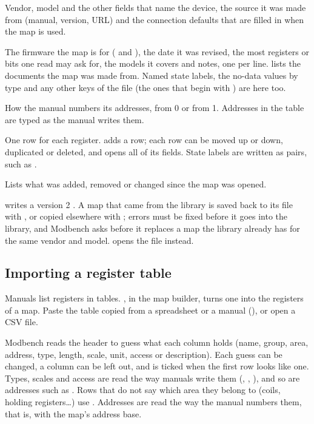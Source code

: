 \begin{description}[style=nextline, leftmargin=0pt, font=\intermedium]
  \item[Device] Vendor, model and the other fields that name the device, the
    source it was made from (manual, version, URL) and the connection defaults
    that are filled in when the map is used.
  \item[Optional parameters] The firmware the map is for ( and ), the date it was revised, the most
    registers or bits one read may ask for, the models it covers and notes,
    one per line.  lists the documents the map was made from.
    Named state labels, the no-data values by type and any other keys of the
    file (the ones that begin with ) are here too.
  \item[Address base] How the manual numbers its addresses, from 0 or from 1.
    Addresses in the table are typed as the manual writes them.
  \item[Registers] One row for each register.  adds a row;
    each row can be moved up or down, duplicated or deleted, and
     opens all of its fields. State labels are written as
    pairs, such as .
  \item[Changes from the original] Lists what was added, removed or changed
    since the map was opened.
\end{description}

 writes a version 2 . A map that came from the
library is saved back to its file with , or copied elsewhere with
; errors must be fixed before it goes into the library, and
Modbench asks before it replaces a map the library already has for the same
vendor and model.  opens the file instead.

\subsection{Importing a register table}

Manuals list registers in tables. , in the map builder,
turns one into the registers of a map. Paste the table copied from a
spreadsheet or a manual (), or open a CSV file.

Modbench reads the header to guess what each column holds (name, group, area,
address, type, length, scale, unit, access or description). Each guess can be
changed, a column can be left out, and  is
ticked when the first row looks like one. Types, scales and access are read the
way manuals write them (, , ), and so are
addresses such as . Rows that do not say
which area they belong to (coils, holding registers…) use
. Addresses are read the way the manual
numbers them, that is, with the map's address base.

